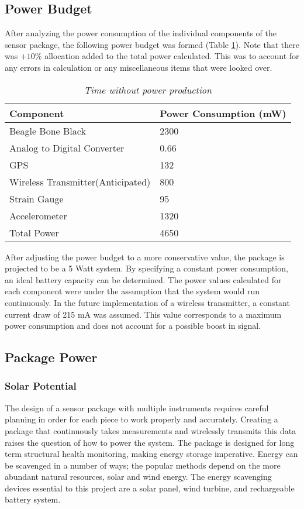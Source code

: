 
\subsection{Power Budget}
\indent After analyzing the power consumption of the individual components of the sensor package, the following power budget was formed (Table \ref*{tab:PowerBudget}). Note that there was $+10\%$ allocation added to the total power calculated. This was to account for any errors in calculation or any miscellaneous items that were looked over. 

\begin{table}
\centering
\begin{tabular}{|l|l|}\hline
Component & Power Consumption (mW)\\\hline
Beagle Bone Black & 2300\\\hline
Analog to Digital Converter & 0.66\\\hline
GPS & 132\\\hline
Wireless Transmitter(Anticipated) & 800\\\hline
Strain Gauge & 95\\\hline
Accelerometer & 1320\\\hline
Total Power & 4650\\
\hline

\end{tabular}
\caption{\textit{Time without power production}}
\label{tab:PowerBudget}
\end{table}

\indent After adjusting the power budget to a more conservative value, the package is projected to be a 5 Watt system. By specifying a constant power consumption, an ideal battery capacity can be determined. The power values calculated for each component were under the assumption that the system would run continuously. In the future implementation of a wireless transmitter, a constant current draw of 215 mA was assumed. This value corresponds to a maximum power consumption and does not account for a possible boost in signal. 


\subsection{Package Power}

\subsubsection{Solar Potential}

\indent The design of a sensor package with multiple instruments requires careful planning in order for each piece to work properly and accurately. Creating a package that continuously takes measurements and wirelessly transmits this data raises the question of how to power the system. The package is designed for long term structural health monitoring, making energy storage imperative.  Energy can be scavenged in a number of ways; the popular methods depend on the more abundant natural resources, solar and wind energy. The energy scavenging devices essential to this project are a solar panel, wind turbine, and rechargeable battery system.\\


